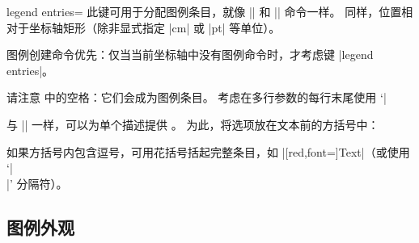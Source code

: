 \begin{pgfplotskey}{legend entries=}
    此键可用于分配图例条目，就像 |\addlegendentry| 和 |\legend| 命令一样。
    同样，位置相对于坐标轴矩形（除非显式指定 |cm| 或 |pt| 等单位）。
\begin{codeexample}[]
\end{codeexample}

    图例创建命令优先：仅当当前坐标轴中没有图例命令时，才考虑键
    |legend entries|。
\begin{codeexample}[]
\end{codeexample}
    请注意  中的空格：它们会成为图例条目。
    考虑在多行参数的每行末尾使用 `|%

    与 |\addlegendentry| 一样，可以为单个描述提供 。
    为此，将选项放在文本前的方括号中：
\begin{codeexample}[]
\end{codeexample}
    如果方括号内包含逗号，可用花括号括起完整条目，如
    |{[red,font=\Huge]Text}|（或使用 `|\\|' 分隔符）。
\end{pgfplotskey}


\subsection{图例外观}

